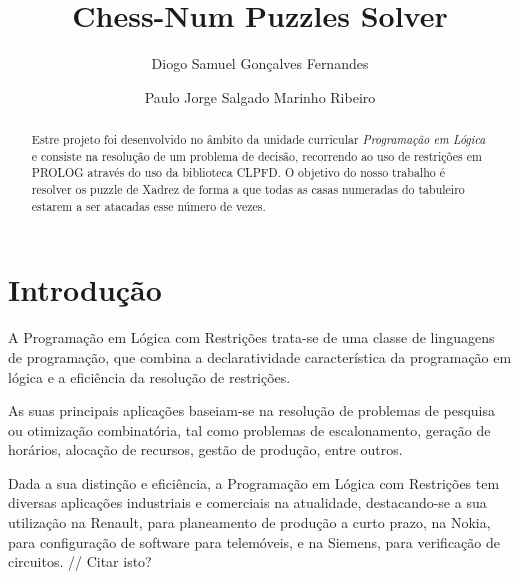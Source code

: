 \documentclass[runningheads]{llncs}
\begin{document}
%
\title{Chess-Num Puzzles Solver}
\author{Diogo Samuel Gonçalves Fernandes \and
Paulo Jorge Salgado Marinho Ribeiro}

%
\maketitle
\begin{abstract}
Estre projeto foi desenvolvido no âmbito da unidade curricular \emph{Programação em Lógica} e consiste na resolução de um problema
de decisão, recorrendo ao uso de restrições em PROLOG através do uso da biblioteca CLPFD. O objetivo do nosso trabalho é resolver
os puzzle de Xadrez de forma a que todas as casas numeradas do tabuleiro estarem a ser atacadas esse número de vezes.

\end{abstract}

\section{Introdução}
A Programação em Lógica com Restrições trata-se de uma classe de linguagens de programação, que combina a declaratividade característica da programação em lógica
e a eficiência da resolução de restrições. 

As suas principais aplicações baseiam-se na resolução de problemas de pesquisa ou otimização combinatória, 
tal como problemas de escalonamento, geração de horários, alocação de recursos, gestão de produção, entre outros.

Dada a sua distinção e eficiência, a Programação em Lógica com Restrições tem diversas aplicações industriais e comerciais na atualidade, 
destacando-se a sua utilização na Renault, para planeamento de produção a curto prazo, na Nokia, para configuração de software para telemóveis, 
e na Siemens, para verificação de circuitos. // Citar isto?
\end{document}

